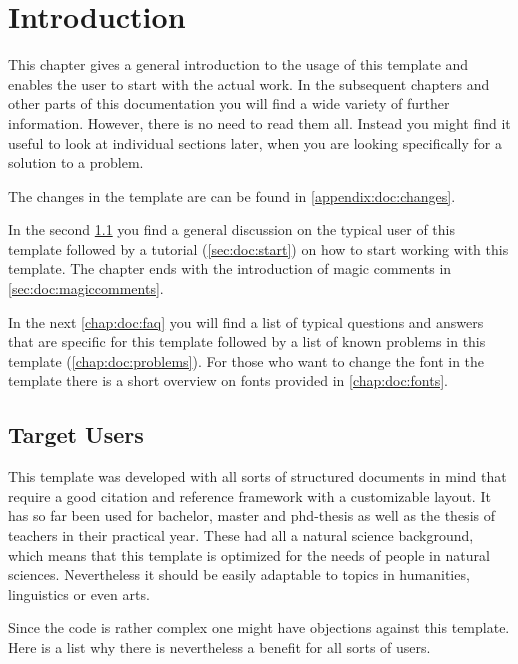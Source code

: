 \chapter{Introduction}

This chapter gives a general introduction to the usage of this template and enables the user to start with the actual work. 
In the subsequent chapters and other parts of this documentation you will find a wide variety of further information. However, there is no need to read them all. Instead you might find it useful to look at individual sections later, when you are looking specifically for a solution to a problem.

The changes in the template are can be found in \cref{appendix:doc:changes}.

In the second \cref{sec:doc:targetusers} you find a general discussion on the typical user of this template followed by a tutorial (\cref{sec:doc:start}) on how to start working with this template. The chapter ends with the introduction of magic comments in \cref{sec:doc:magiccomments}.

In the next \cref{chap:doc:faq} you will find a list of typical questions and answers that are specific for this template followed by a list of known problems in this template (\cref{chap:doc:problems}). For those who want to change the font in the template there is a short overview on fonts provided in \cref{chap:doc:fonts}.
\section{Target Users}
\label{sec:doc:targetusers}

This template was developed with all sorts of structured documents in mind that require a good citation and reference framework with a customizable layout. It has so far been used for bachelor, master and phd-thesis as well as the thesis of teachers in their practical year. These had all a natural science background, which means that this template is optimized for the needs of people in natural sciences. Nevertheless it should be easily adaptable to topics in humanities, linguistics or even arts.

Since the code is rather complex one might have objections against this template. Here is a list why there is nevertheless a benefit for all sorts of users.

